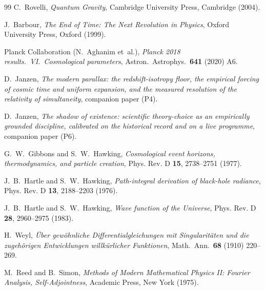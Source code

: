 \documentclass[11pt,a4paper]{article}
\theoremstyle{plain}
\theoremstyle{definition}
\theoremstyle{remark}
\begin{document}
\begin{thebibliography}{99}
C.~Rovelli,
\emph{Quantum Gravity},
Cambridge University Press, Cambridge (2004).

J.~Barbour,
\emph{The End of Time: The Next Revolution in Physics},
Oxford University Press, Oxford (1999).

Planck Collaboration (N.~Aghanim et~al.),
\emph{Planck 2018 results.~VI.~Cosmological parameters},
Astron.~Astrophys.~\textbf{641} (2020) A6.

D.~Janzen,
\emph{The modern parallax: the redshift-isotropy floor, the empirical forcing of cosmic time and uniform expansion, and the measured resolution of the relativity of simultaneity}, companion paper (P4).

D.~Janzen,
\emph{The shadow of existence: scientific theory-choice as an empirically grounded discipline, calibrated on the historical record and on a live programme}, companion paper (P6).

G.~W.~Gibbons and S.~W.~Hawking,
\emph{Cosmological event horizons, thermodynamics, and particle creation},
Phys. Rev. D \textbf{15}, 2738--2751 (1977).

J.~B.~Hartle and S.~W.~Hawking,
\emph{Path-integral derivation of black-hole radiance},
Phys. Rev. D \textbf{13}, 2188--2203 (1976).

J.~B.~Hartle and S.~W.~Hawking,
\emph{Wave function of the Universe},
Phys. Rev. D \textbf{28}, 2960--2975 (1983).

H.~Weyl,
\emph{\"Uber gew\"ohnliche Differentialgleichungen mit Singularit\"aten und die zugeh\"origen Entwicklungen willk\"urlicher Funktionen},
Math.~Ann.~\textbf{68} (1910) 220--269.

M.~Reed and B.~Simon,
\emph{Methods of Modern Mathematical Physics II: Fourier Analysis, Self-Adjointness},
Academic Press, New York (1975).


\end{thebibliography}
\end{document}
